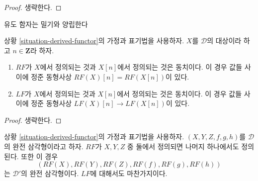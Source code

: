 \begin{proof}
생략한다.
\end{proof}

\begin{lemma}
\label{lemma-derived-shift}
\begin{slogan}
유도 함자는 밀기와 양립한다
\end{slogan}
상황 \ref{situation-derived-functor}의 가정과 표기법을 사용하자.
$X$를 $\mathcal{D}$의 대상이라 하고 $n \in \mathbf{Z}$라 하자.
\begin{enumerate}
\item $RF$가 $X$에서 정의되는 것과 $X[n]$에서 정의되는 것은 동치이다.
이 경우 값들 사이에 정준 동형사상 $RF(X)[n]= RF(X[n])$이 있다.
\item $LF$가 $X$에서 정의되는 것과 $X[n]$에서 정의되는 것은 동치이다.
이 경우 값들 사이에 정준 동형사상 $LF(X)[n] \to LF(X[n])$이 있다.
\end{enumerate}
\end{lemma}

\begin{proof}
생략한다.
\end{proof}
\begin{lemma}
\label{lemma-2-out-of-3-defined}
상황 \ref{situation-derived-functor}의 가정과 표기법을 사용하자.
$(X, Y, Z, f, g, h)$를 $\mathcal{D}$의 완전 삼각형이라고 하자.
$RF$가 $X, Y, Z$ 중 둘에서 정의되면 나머지 하나에서도 정의된다.
또한 이 경우
$$
(RF(X), RF(Y), RF(Z), RF(f), RF(g), RF(h))
$$
는 $\mathcal{D}'$의 완전 삼각형이다. $LF$에 대해서도 마찬가지이다.
\end{lemma}

